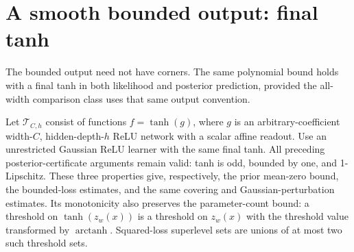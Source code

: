 \section{A smooth bounded output: final tanh}
\label{sec:smooth-output}
The bounded output need not have corners. The same polynomial bound holds with a final tanh in both likelihood and posterior prediction, provided the all-width comparison class uses that same output convention.

Let $\mathcal T_{C,h}$ consist of functions $f=\tanh(g)$, where $g$ is an arbitrary-coefficient width-$C$, hidden-depth-$h$ ReLU network with a scalar affine readout. Use an unrestricted Gaussian ReLU learner with the same final tanh. All preceding posterior-certificate arguments remain valid: tanh is odd, bounded by one, and 1-Lipschitz. These three properties give, respectively, the prior mean-zero bound, the bounded-loss estimates, and the same covering and Gaussian-perturbation estimates. Its monotonicity also preserves the parameter-count bound: a threshold on $\tanh(z_w(x))$ is a threshold on $z_w(x)$ with the threshold value transformed by $\operatorname{arctanh}$. Squared-loss superlevel sets are unions of at most two such threshold sets.

